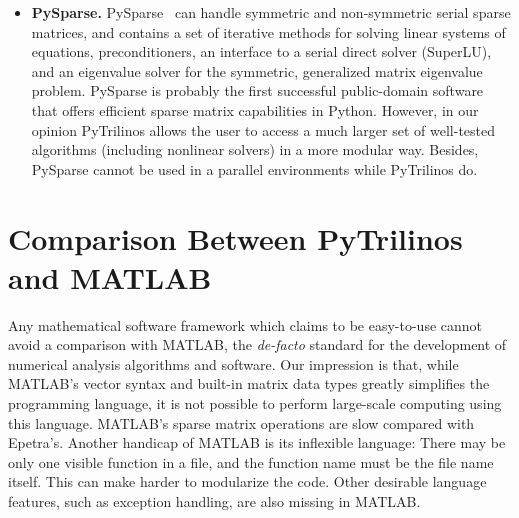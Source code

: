 \documentclass[acmtocl]{acmtrans2m}
\begin{document}
\begin{itemize}
\item {\bf PySparse.}   PySparse~\cite{broker05using} can
  handle symmetric and non-symmetric serial sparse matrices, and contains a
  set of iterative methods for solving linear systems of equations,
  preconditioners, an interface to a serial direct solver (SuperLU), and an
  eigenvalue solver for the symmetric, generalized matrix eigenvalue problem.
  PySparse is probably the first successful public-domain software that offers
  efficient sparse matrix capabilities in Python. However, in our opinion
  PyTrilinos allows the user to access a much larger set of well-tested
  algorithms (including nonlinear solvers) 
  in a more modular way. Besides, PySparse cannot be used in a
  parallel environments while PyTrilinos do.

\end{itemize}

\section{Comparison Between PyTrilinos and MATLAB}
\label{sec:comparison_matlab}

Any mathematical software framework which
claims to be easy-to-use cannot avoid a comparison with MATLAB, the
{\sl de-facto} standard for the development of numerical analysis
algorithms and software. Our impression is that, while MATLAB's
vector syntax and built-in matrix data types greatly simplifies the
programming language, it is not possible to perform large-scale
computing using this language. MATLAB's sparse matrix operations are
slow compared with Epetra's. Another handicap of MATLAB is its
inflexible language: There may be only one visible function in a
file, and the function name must be the file name itself. This can
make harder to modularize the code.  Other desirable language
features, such as exception handling, are also missing in MATLAB.
\end{document}
